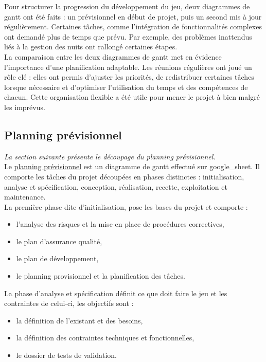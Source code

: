 \documentclass[11pt, a4paper]{article}
\begin{document}
        Pour structurer la progression du développement du jeu, deux diagrammes de \Gls{gantt} ont été faits : un prévisionnel en début de projet, puis un second mis à jour régulièrement. Certaines tâches, comme l’intégration de fonctionnalités complexes ont demandé plus de temps que prévu. Par exemple, des problèmes inattendus liés à la gestion des nuits ont rallongé certaines étapes.\\
        
        La comparaison entre les deux diagrammes de \Gls{gantt} met en évidence l’importance d’une planification adaptable. Les réunions régulières ont joué un rôle clé : elles ont permis d’ajuster les priorités, de redistribuer certaines tâches lorsque nécessaire et d’optimiser l’utilisation du temps et des compétences de chacun. Cette organisation flexible a été utile pour mener le projet à bien malgré les imprévus.

    \subsection{Planning prévisionnel}
    \textit{La section suivante présente le découpage du planning prévisionnel.}\\

    Le \href{https://docs.google.com/spreadsheets/d/10BtX8lV49BRHHMKD-WF7gbojdl62evs0IOK-swW39dE/edit?usp=drive_link}{planning prévisionnel} est un diagramme de \Gls{gantt} effectué sur \Gls{google_sheet}. Il comporte les tâches du projet découpées en phases distinctes : initialisation, analyse et spécification, conception, réalisation, recette, exploitation et maintenance.\\
 
    La première phase dite d’initialisation, pose les bases du projet et comporte :
    \begin{itemize}
            \item l'analyse des risques et la mise en place de procédures correctives,
            \item le plan d’assurance qualité,
            \item le plan de développement,
            \item le planning provisionnel et la planification des tâches.\\
    \end{itemize}

    La phase d’analyse et spécification définit ce que doit faire le jeu et les contraintes de celui-ci, les objectifs sont :
    \begin{itemize}
            \item la définition de l'existant et des besoins,
            \item la définition des contraintes techniques et fonctionnelles,
            \item le dossier de tests de validation.\\
    \end{itemize}
\end{document}
